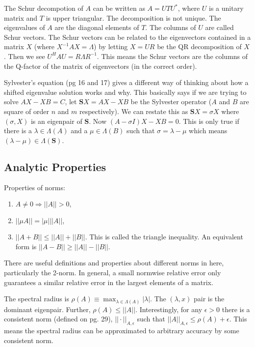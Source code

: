 \documentclass[12pt,twoside]{article}
\newcommand{\ve}[1]{\ensuremath{\mathbf{#1}}}
\begin{document}
The Schur decompotion of $A$ can be written as $A = UTU^*$, where $U$ is a unitary matrix and $T$ is upper triangular. The decomposition is not unique. The eigenvalues of $A$ are the diagonal elements of $T$. The columns of $U$ are called Schur vectors. The Schur vectors can be related to the eigenvectors contained in a matrix $X$ (where $X^{-1}AX = \Lambda$) by letting $X = UR$ be the QR decomposition of $X$. Then we see $U^{H}AU = R\Lambda R^{-1}$. This means the Schur vectors are the columns of the Q-factor of the matrix of eigenvectors (in the correct order).

Sylvester's equation (pg 16 and 17) gives a different way of thinking about how a shifted eigenvalue solution works and why. This basically says if we are trying to solve $AX - XB = C$, let \ve{S}$X = AX - XB$ be the Sylvester operator ($A$ and $B$ are square of order $n$ and $m$ respectively). We can restate this as $\ve{S}X = \sigma X$ where $(\sigma, X)$ is an eigenpair of \ve{S}. Now $(A - \sigma I)X - XB = 0$. This is only true if there is a $\lambda \in \Lambda(A)$ and a $\mu \in \Lambda(B)$ such that $\sigma = \lambda - \mu$ which means $(\lambda - \mu) \in \Lambda(\ve{S})$. 

\subsection{Analytic Properties}
Properties of norms:
\begin{enumerate}
  \item $A \ne 0 \Longrightarrow ||A|| > 0$,
  \item $||\mu A|| = |\mu| ||A||$,
  \item $||A + B|| \le ||A|| + ||B||$. This is called the triangle inequality. An equivalent form is $||A - B|| \ge ||A|| - ||B||$.
\end{enumerate}
There are useful definitions and properties about different norms in here, particularly the 2-norm. In general, a small normwise relative error only guarantees a similar relative error in the largest elements of a matrix. 

The spectral radius is $\rho(A) \equiv \max_{\lambda \in \Lambda(A)} |\lambda|$. The $(\lambda,x)$ pair is the dominant eigenpair. Further, $\rho(A) \le ||A||$. Interestingly, for any $\epsilon > 0$ there is a consistent norm (defined on pg. 29), $||\cdot||_{A,\epsilon}$ such that $||A||_{A,\epsilon} \le \rho(A) + \epsilon$. This means the spectral radius can be approximated to arbitrary accuracy by some consistent norm.
\end{document}
